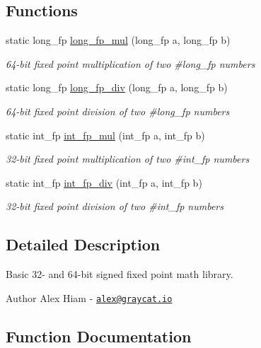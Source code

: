 \subsection*{Functions}
\begin{DoxyCompactItemize}
\item 
static long\+\_\+fp \hyperlink{gcl-fixedpoint_8h_ad45629d9a653818caf57b313d4a8d7c3}{long\+\_\+fp\+\_\+mul} (long\+\_\+fp a, long\+\_\+fp b)
\begin{DoxyCompactList}\small\item\em 64-\/bit fixed point multiplication of two \#long\+\_\+fp numbers \end{DoxyCompactList}\item 
static long\+\_\+fp \hyperlink{gcl-fixedpoint_8h_ab5f92bb60e66fda1d36981c1df6563ea}{long\+\_\+fp\+\_\+div} (long\+\_\+fp a, long\+\_\+fp b)
\begin{DoxyCompactList}\small\item\em 64-\/bit fixed point division of two \#long\+\_\+fp numbers \end{DoxyCompactList}\item 
static int\+\_\+fp \hyperlink{gcl-fixedpoint_8h_aae0a3c76fcea84dc584a115420a9466b}{int\+\_\+fp\+\_\+mul} (int\+\_\+fp a, int\+\_\+fp b)
\begin{DoxyCompactList}\small\item\em 32-\/bit fixed point multiplication of two \#int\+\_\+fp numbers \end{DoxyCompactList}\item 
static int\+\_\+fp \hyperlink{gcl-fixedpoint_8h_ac7b70a1b6980b5da47e896f5d97ee8a2}{int\+\_\+fp\+\_\+div} (int\+\_\+fp a, int\+\_\+fp b)
\begin{DoxyCompactList}\small\item\em 32-\/bit fixed point division of two \#int\+\_\+fp numbers \end{DoxyCompactList}\end{DoxyCompactItemize}


\subsection{Detailed Description}
Basic 32-\/ and 64-\/bit signed fixed point math library. 

\begin{DoxyAuthor}{Author}
Alex Hiam -\/ \href{mailto:alex@graycat.io}{\tt alex@graycat.\+io} 
\end{DoxyAuthor}


\subsection{Function Documentation}
